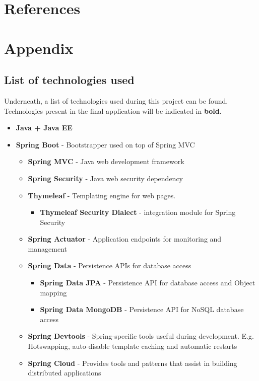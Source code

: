 \documentclass[12pt]{article}
\begin{document}
\newpage
\section{References}




\newpage
\section{Appendix}
\subsection{List of technologies used}
Underneath, a list of technologies used during this project can be found. Technologies present in the final application will be indicated in \textbf{bold}.
\begin{itemize}[leftmargin=20pt]
	\item \textbf{Java + Java EE}
	\item \textbf{Spring Boot} - Bootstrapper used on top of Spring MVC
	\begin{itemize}[leftmargin=20pt]
		\item \textbf{Spring MVC} - Java web development framework
		\item \textbf{Spring Security} - Java web security dependency
		\item \textbf{Thymeleaf} - Templating engine for web pages.
		\begin{itemize}[leftmargin=20pt]
				\item  \textbf{Thymeleaf Security Dialect} - integration module for Spring Security
		\end{itemize}
		\item \textbf{Spring Actuator} - Application endpoints for monitoring and management
		\item \textbf{Spring Data} - Persistence APIs for database access
		\begin{itemize}
			\item \textbf{Spring Data JPA} - Persistence API for database access and Object mapping
			\item \textbf{Spring Data MongoDB} - Persistence API for NoSQL database access
		\end{itemize}
		\item \textbf{Spring Devtools} - Spring-specific tools useful during development. E.g. Hotswapping, auto-disable template caching and automatic restarts
		\item \textbf{Spring Cloud} - Provides tools and patterns that assist in building distributed applications

\end{itemize}
\end{itemize}
\end{document}
